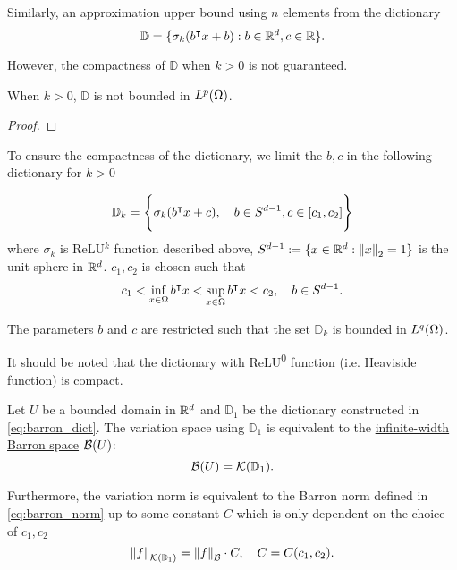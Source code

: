 Similarly, an approximation upper bound using $n$ elements from the dictionary 
\begin{equation}
    \mathbb{D} = \{
        \sigma_k(b{}^{\intercal} x + b): b\in\mathbb{R}^d, c\in\mathbb{R}
    \}.
\end{equation}

However, the compactness of $\mathbb{D}$ when $k > 0$ is not guaranteed. 

\begin{proposition}
    When $k > 0$, $\mathbb{D}$ is not bounded in $L^{p}(\Omega)$.
\end{proposition}
\begin{proof}
    
\end{proof}

To ensure the compactness of the dictionary, we limit the $b, c$ in the
following dictionary for $k>0$

\begin{equation}
    \label{eq:barron_dict}
    \mathbb{D}_{k} = \Bigg\{
        \sigma_k(b{}^{\intercal} x + c), \quad b\in S^{d-1}, c\in [c_1, c_2] 
    \Bigg\}
\end{equation}
where $\sigma_k$ is ReLU$^k$ function described above, $S^{d-1} := \{x\in\mathbb{R}^d:
\left\| x \right\|_2 = 1\}$ is the unit sphere in $\mathbb{R}^d$. $c_1, c_2$ is chosen such that
\begin{equation}
    c_1 < \inf_{x\in\Omega} b{}^{\intercal} x < 
    \sup_{x\in\Omega} b{}^{\intercal} x < c_2, \quad
    b \in S^{d-1}.
\end{equation}

The parameters $b$ and $c$ are restricted such that the set $\mathbb{D}_k$ is
bounded in $L^{q}(\Omega)$.

It should be noted that the dictionary with ReLU\textsuperscript{0} function
(i.e. Heaviside function) is compact.

\begin{proposition}
    Let $U$ be a bounded domain in $\mathbb{R}^d$ and $\mathbb{D}_1$ be the
    dictionary constructed in \eqref{eq:barron_dict}. The variation space using $\mathbb{D}_1$ is equivalent to the \hyperref[def:barron_space]{infinite-width Barron space} $\mathcal{B}(U)$:
    \begin{equation}
        \mathcal{B}(U) = \mathcal{K}({\mathbb{D}_1}).
    \end{equation}
    
    Furthermore, the variation norm is equivalent to the Barron norm defined in
    \eqref{eq:barron_norm} up to some constant $C$ which is only dependent on
    the choice of $c_1, c_2$
    \begin{equation}
        \left\| {f} \right\|_{\mathcal{K}({\mathbb{D}_1})} = \left\| f \right\|_{\mathcal{B}} \cdot C, \quad 
        C = C(c_1, c_2).
    \end{equation}
\end{proposition}

